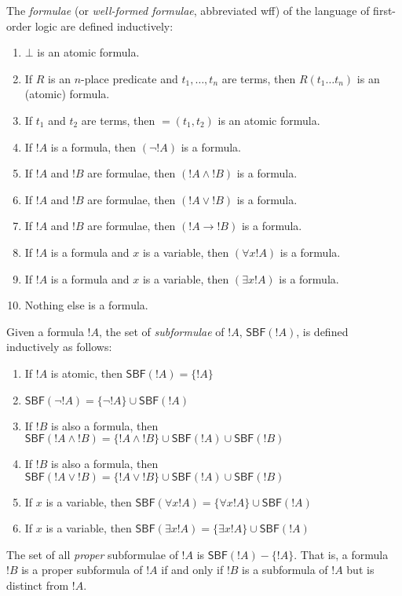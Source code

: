 \documentclass[syntax-and-semantics]{subfiles}
\begin{document}
\begin{defn}[Formula]
The \emph{formulae} (or \emph{well-formed formulae}, abbreviated wff) of the language of first-order logic are defined inductively:
\begin{enumerate}
\item $\bot$ is an atomic formula.
\item If $R$ is an $n$-place predicate and $t_1,\ldots,t_n$ are terms, then $R(t_1\ldots t_n)$ is an (atomic) formula.
\item If $t_1$ and $t_2$ are terms, then $=(t_1,t_2)$ is an atomic formula.
\item If $!A$ is a formula, then $(\lnot !A)$ is a formula.
\item If $!A$ and $!B$ are formulae, then $(!A \land !B)$ is a formula.
\item If $!A$ and $!B$ are formulae, then $(!A \lor !B)$ is a formula.
\item If $!A$ and $!B$ are formulae, then $(!A \rightarrow !B)$ is a formula.
\item If $!A$ is a formula and $x$ is a variable, then $(\forall x !A)$ is a formula.
\item If $!A$ is a formula and $x$ is a variable, then $(\exists x !A)$ is a formula.
\item Nothing else is a formula.
\end{enumerate}
\end{defn}


\begin{defn}[Subformula]
Given a formula $!A$, the set of \emph{subformulae} of $!A$, $\mathsf{SBF}(!A)$, is defined inductively as follows:
\begin{enumerate}
\item If $!A$ is atomic, then $\mathsf{SBF}(!A)=\{!A\}$
\item $\mathsf{SBF}(\lnot !A) = \{\lnot !A\} \cup \mathsf{SBF}(!A)$
\item If $!B$ is also a formula, then $\mathsf{SBF}(!A \land !B) = \{!A \land !B\} \cup \mathsf{SBF}(!A) \cup \mathsf{SBF}(!B)$
\item If $!B$ is also a formula, then $\mathsf{SBF}(!A \lor !B) = \{!A \lor !B\} \cup \mathsf{SBF}(!A) \cup \mathsf{SBF}(!B)$
\item If $x$ is a variable, then $\mathsf{SBF}(\forall x !A) = \{\forall x !A\} \cup \mathsf{SBF}(!A)$
\item If $x$ is a variable, then $\mathsf{SBF}(\exists x !A) = \{\exists x !A\} \cup \mathsf{SBF}(!A)$
\end{enumerate}
The set of all \emph{proper} subformulae of $!A$ is $\mathsf{SBF}(!A) - \{!A\}$. That is, a formula $!B$ is a proper subformula of $!A$ if and only if $!B$ is a subformula of $!A$ but is distinct from $!A$. 
\end{defn}
\end{document}
